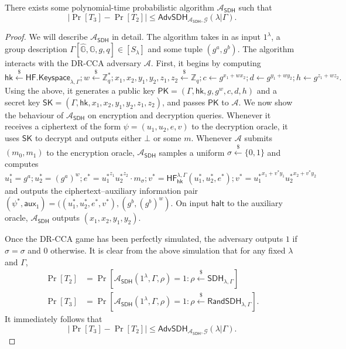 \documentclass[10pt,a4paper]{article}
\newcommand{\adv}{\mathcal{A}}
\newcommand{\SK}{\mathsf{SK}}
\newcommand{\PK}{\mathsf{PK}}
\newcommand{\rgets}{\xleftarrow{\$}}
\newcommand{\G}{\mathbb{G}}
\newcommand{\aux}{\mathsf{aux}}
\newcommand{\hk}{\mathsf{hk}}
\newcommand{\Z}{\mathbb{Z}}
\newcommand{\randsdh}{\mathsf{RandSDH}}
\newcommand{\sdh}{\mathsf{SDH}}
\begin{document}
	\begin{lemma}
		There exists some polynomial-time probabilistic algorithm $\adv_\mathsf{SDH}$ such that $$|\Pr[T_3]-\Pr[T_2]|\leq\mathsf{AdvSDH}_{\adv_\mathsf{SDH}, \mathcal{G}}(\lambda|\Gamma).$$
	\end{lemma}
	\begin{proof}
		We will describe $\adv_\mathsf{SDH}$ in detail. The algorithm takes in as input $1^\lambda$, a group description $\Gamma[\hat{\G},\G,g,q]\in[S_\lambda]$ and some tuple $(g^a, g^{b})$. The algorithm interacts with the DR-CCA adversary $\adv$. First, it begins by computing
		$$\hk\rgets\mathsf{HF.Keyspace}_{\lambda, \Gamma}; w\rgets\Z^{*}_q; x_1,x_2,y_1,y_2,z_1,z_2\rgets\Z_q; c\gets g^{x_1+wx_2}; d\gets g^{y_1+wy_2}; h\gets g^{z_1+wz_2}.$$
		Using the above, it generates a public key $\PK = (\Gamma, \hk, g,g^w, c, d, h)$ and a secret key $\SK = (\Gamma,\hk,x_1,x_2,y_1,y_2,z_1,z_2)$, and passes $\PK$ to $\adv$. We now show the behaviour of $\adv_\mathsf{SDH}$ on encryption and decryption queries. Whenever it receives a ciphertext of the form $\psi = (u_1,u_2,e,v)$ to the decryption oracle, it uses $\SK$ to decrypt and outputs either $\bot$ or some $m$. Whenever $\adv$ submits $(m_0,m_1)$ to the encryption oracle, $\adv_\mathsf{SDH}$ samples a uniform $\sigma\rgets\{0,1\}$ and computes
		$$u_1^{*} = g^a; u_2^{*} = (g^a)^w; e^{*} = {u_1^{*}}^{z_1}{u_2^{*}}^{z_2}\cdot m_\sigma; v^{*} =\mathsf{HF}_{\hk}^{\lambda,\Gamma}(u_1^{*},u_2^{*},e^{*}); v^{*} = {u_1^{*}}^{x_1+v^{*}y_1}{u_2^{*}}^{x_2+v^{*}y_2}$$ and outputs the ciphertext--auxiliary information pair $(\psi^{*},\aux_1) = ((u_1^{*},u_2^{*},e^{*},v^{*}), (g^{b}, (g^{b})^w).$ On input $\mathsf{halt}$ to the auxiliary oracle, $\adv_\mathsf{SDH}$ outputs $(x_1,x_2,y_1,y_2)$.
		
		Once the DR-CCA game has been perfectly simulated, the adversary outputs $1$ if $\hat{\sigma} = \sigma$ and $0$ otherwise. It is clear from the above simulation that for any fixed $\lambda$ and $\Gamma$, 
		\begin{align*}
			\Pr[T_2] &= \Pr[\adv_\mathsf{SDH}(1^\lambda,\Gamma,\rho) = 1 : \rho\rgets\sdh_{\lambda,\Gamma}]\\
			\Pr[T_3] &= \Pr[\adv_\mathsf{SDH}(1^\lambda,\Gamma,\rho) = 1 : \rho\rgets\randsdh_{\lambda,\Gamma}].
		\end{align*}
		It immediately follows that 
		$$|\Pr[T_3]-\Pr[T_2]|\leq\mathsf{AdvSDH}_{\adv_\mathsf{SDH}, \mathcal{G}}(\lambda|\Gamma).$$
	\end{proof}
	
\end{document}
